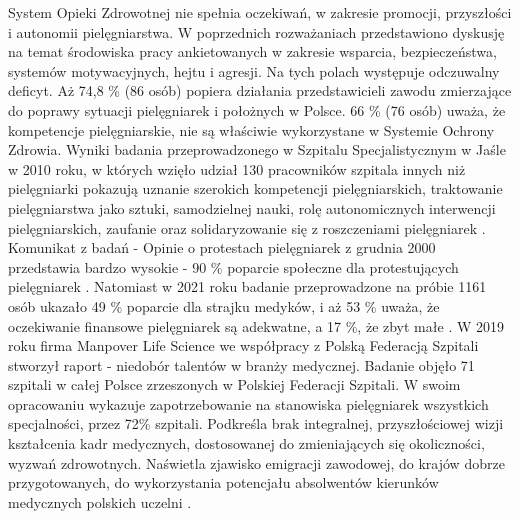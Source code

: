 \documentclass[a4paper,12pt,twoside,openany]{report}
\begin{document}
System Opieki Zdrowotnej nie spełnia oczekiwań, w zakresie promocji, przyszłości i autonomii pielęgniarstwa. W poprzednich rozważaniach przedstawiono dyskusję  na temat środowiska pracy ankietowanych w zakresie wsparcia, bezpieczeństwa, systemów motywacyjnych, hejtu  i agresji. Na tych polach występuje odczuwalny deficyt. Aż 74,8 \%  (86 osób) popiera działania przedstawicieli zawodu zmierzające do poprawy sytuacji pielęgniarek i położnych w Polsce.  66 \% (76 osób) uważa, że kompetencje pielęgniarskie, nie są właściwie wykorzystane w Systemie Ochrony Zdrowia. Wyniki badania przeprowadzonego w Szpitalu Specjalistycznym w Jaśle w 2010 roku, w których wzięło udział 130 pracowników szpitala innych niż pielęgniarki pokazują uznanie szerokich kompetencji pielęgniarskich, traktowanie pielęgniarstwa jako sztuki, samodzielnej nauki, rolę autonomicznych interwencji pielęgniarskich, zaufanie oraz solidaryzowanie się z roszczeniami pielęgniarek \cite{skorupska}. Komunikat z badań - Opinie o protestach pielęgniarek z grudnia 2000 przedstawia bardzo wysokie - 90  \%  poparcie  społeczne dla protestujących pielęgniarek \cite{cebos}. Natomiast w 2021 roku badanie przeprowadzone na próbie 1161 osób ukazało 49 \% poparcie dla strajku medyków, i aż 53 \% uważa, że oczekiwanie finansowe pielęgniarek są adekwatne, a 17 \%, że zbyt małe \cite{cebos2}. W 2019 roku firma Manpover Life Science we współpracy z Polską Federacją Szpitali stworzył raport - niedobór talentów w branży medycznej. Badanie objęło 71 szpitali w całej Polsce zrzeszonych w Polskiej Federacji Szpitali. W swoim opracowaniu wykazuje zapotrzebowanie na stanowiska pielęgniarek wszystkich specjalności, przez 72\% szpitali. Podkreśla brak integralnej, przyszłościowej wizji kształcenia kadr medycznych, dostosowanej do zmieniających się okoliczności, wyzwań zdrowotnych. Naświetla zjawisko emigracji zawodowej,  do krajów dobrze przygotowanych, do wykorzystania potencjału absolwentów kierunków medycznych polskich uczelni  \cite{federacja}.








\appendix
\end{document}
